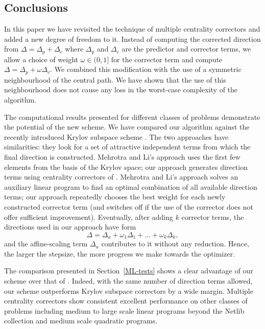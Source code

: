 %
%
\subsection{Conclusions}
\label{Conclusions}

In this paper we have revisited the technique of multiple centrality 
correctors \cite{Gondzio96} and added a new degree of freedom to it. 
Instead of computing the corrected direction from 
$\Delta = \Delta_p + \Delta_c$ where $\Delta_p$ and $\Delta_c$ are 
the predictor and corrector terms, we allow a choice of weight 
$\omega \in (0,1]$ for the corrector term and compute 
$\Delta = \Delta_p + \omega \Delta_c$.
We combined this modification with the use of a symmetric neighbourhood
of the central path. We have shown that the use of this neighbourhood
does not cause any loss in the worst-case complexity of the algorithm. 

The computational results presented for different classes of problems 
demonstrate the potential of the new scheme. We have compared our algorithm 
against the recently introduced Krylov subspace scheme \cite{MehrotraLi}.
The two approaches have similarities: they look for a set of attractive 
independent terms from which the final direction is constructed. 
Mehrotra and Li's approach uses the first few elements from the basis
of the Krylov space; our approach generates direction terms using 
centrality correctors of \cite{Gondzio96}. Mehrotra and Li's approach 
solves an auxiliary linear program to find an optimal combination 
of all available direction terms; our approach repeatedly chooses 
the best weight for each newly constructed corrector term (and switches 
off if the use of the corrector does not offer sufficient improvement). 
Eventually, after adding $k$ corrector terms, 
the directions used in our approach have form
\[
\Delta = \Delta_a + \omega_1\Delta_1 + \ldots + \omega_k\Delta_k,
\]
and the affine-scaling term $\Delta_a$ contributes to it without any
reduction. Hence, the larger the stepsize, the more progress we make
towards the optimizer.

The comparison presented in Section~\ref{ML-tests} shows a clear advantage 
of our scheme over that of \cite{MehrotraLi}. Indeed, with the same 
number of direction terms allowed, our scheme outperforms Krylov subspace 
correctors by a wide margin. Multiple centrality correctors show 
consistent excellent performance on other classes of problems
including medium to large scale linear programs beyond the Netlib 
collection and medium scale quadratic programs.

